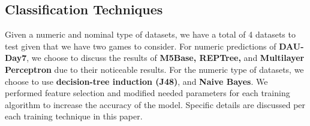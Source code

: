 \subsection{Classification Techniques}
Given a numeric and nominal type of datasets, we have a total of 4 datasets to test given that we have two games to consider. For numeric predictions of \textbf{DAU-Day7}, we choose to discuss the results of \textbf{M5Base, REPTree,} and \textbf{Multilayer Perceptron} due to their noticeable results. For the numeric type of datasets, we choose to use \textbf{decision-tree induction (J48)}, and \textbf{Naive Bayes}. We performed feature selection and modified needed parameters for each training algorithm to increase the accuracy of the model. Specific details are discussed per each training technique in this paper.
